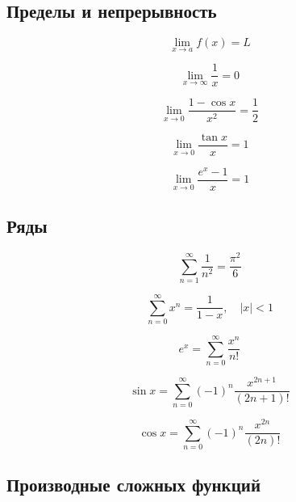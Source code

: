 \documentclass[a4paper,12pt]{article}
\begin{document}
\subsection{Пределы и непрерывность}

\begin{equation}
\lim_{x \to a} f(x) = L
\end{equation}

\begin{equation}
\lim_{x \to \infty} \frac{1}{x} = 0
\end{equation}

\begin{equation}
\lim_{x \to 0} \frac{1 - \cos x}{x^2} = \frac{1}{2}
\end{equation}

\begin{equation}
\lim_{x \to 0} \frac{\tan x}{x} = 1
\end{equation}

\begin{equation}
\lim_{x \to 0} \frac{e^x - 1}{x} = 1
\end{equation}

\subsection{Ряды}

\begin{equation}
\sum_{n=1}^{\infty} \frac{1}{n^2} = \frac{\pi^2}{6}
\end{equation}

\begin{equation}
\sum_{n=0}^{\infty} x^n = \frac{1}{1-x}, \quad |x|<1
\end{equation}

\begin{equation}
e^x = \sum_{n=0}^{\infty} \frac{x^n}{n!}
\end{equation}

\begin{equation}
\sin x = \sum_{n=0}^{\infty} (-1)^n \frac{x^{2n+1}}{(2n+1)!}
\end{equation}

\begin{equation}
\cos x = \sum_{n=0}^{\infty} (-1)^n \frac{x^{2n}}{(2n)!}
\end{equation}

\subsection{Производные сложных функций}
\end{document}
